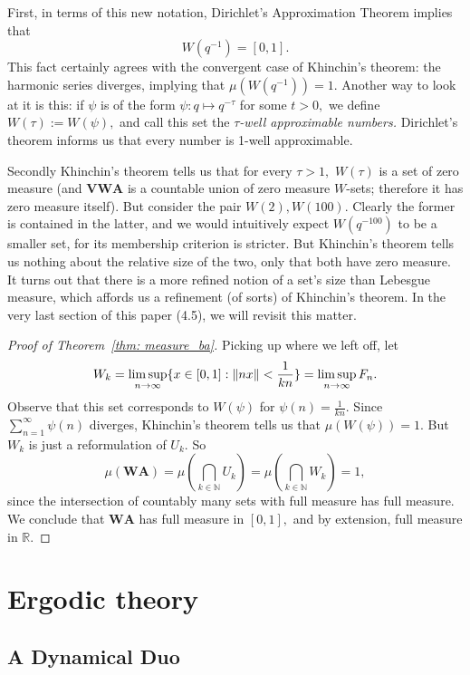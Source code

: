 \documentclass[12pt, letterpaper, oneside]{book}
\newcommand{\gt}{\ensuremath{\tau}}
\newcommand{\R}{\mathbb{R}}
\newcommand{\N}{\mathbb{N}}
\DeclarePairedDelimiter{\norm}{\lVert}{\rVert}
\DeclarePairedDelimiter{\set}{\lbrace}{\rbrace}
\theoremstyle{plain}
\theoremstyle{definition}
\theoremstyle{remark}
\begin{document}
First, in terms of this new notation, Dirichlet's Approximation Theorem implies that
\[
 W(q^{-1}) = [0,1].
\]
This fact certainly agrees with the convergent case of Khinchin's theorem: the harmonic series diverges, implying that $\mu(W(q^{-1})) = 1.$ Another way to look at it is this: if $\psi$ is of the form $\psi:q \mapsto q^{-\gt}$ for some $t > 0,$ we define $W(\gt) := W(\psi),$ and call this set the \textit{$\gt$-well approximable numbers.} Dirichlet's theorem informs us that every number is 1-well approximable. 

Secondly Khinchin's theorem tells us that for every $\gt > 1,$ $W(\gt)$ is a set of zero measure (and $\mathbf{VWA}$ is a countable union of zero measure $W$-sets; therefore it has zero measure itself). But consider the pair $W(2), W(100).$ Clearly the former is contained in the latter, and we would intuitively expect $W(q^{-100})$ to be a smaller set, for its membership criterion is stricter. But Khinchin's theorem tells us nothing about the relative size of the two, only that both have zero measure. It turns out that there is a more refined notion of a set's size than Lebesgue measure, which affords us a refinement (of sorts) of Khinchin's theorem. In the very last section of this paper (4.5), we will revisit this matter. 

\begin{proof}[Proof of Theorem~\ref{thm: measure_ba}]
Picking up where we left off, let 
\[
W_k = \limsup \limits_{n \to \infty} \set{x \in [0,1] : \norm{nx} < \frac{1}{kn}} = \limsup \limits_{n \to \infty} F_n.
\]
Observe that this set corresponds to $W(\psi)$ for $\psi(n) = \frac{1}{kn}.$ Since $\sum_{n = 1}^\infty \psi(n)$ diverges, Khinchin's theorem tells us that $\mu(W(\psi)) = 1.$ But $W_k$ is just a reformulation of $U_k.$ So
\[
\mu(\mathbf{WA}) = \mu(\bigcap_{k \in \N} U_k) = \mu(\bigcap_{k \in \N} W_k) = 1,
\]
since the intersection of countably many sets with full measure has full measure. We conclude that $\mathbf{WA}$ has full measure in $[0,1],$ and by extension, full measure in $\R.$
\end{proof}

\chapter{Ergodic theory}
\section{A Dynamical Duo}
\end{document}
